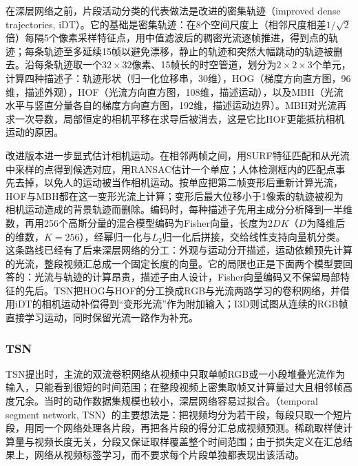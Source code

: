 在深层网络之前，片段活动分类的代表做法是改进的密集轨迹（improved dense trajectories, iDT）。它的基础是密集轨迹：在8个空间尺度上（相邻尺度相差$1/\sqrt{2}$倍）每隔5个像素采样特征点，用中值滤波后的稠密光流逐帧推进，得到点的轨迹；每条轨迹至多延续15帧以避免漂移，静止的轨迹和突然大幅跳动的轨迹被删去。沿每条轨迹取一个$32\times32$像素、15帧长的时空管道，划分为$2\times2\times3$个单元，计算四种描述子：轨迹形状（归一化位移串，30维），HOG（梯度方向直方图，96维，描述外观），HOF（光流方向直方图，108维，描述运动），以及MBH（光流水平与竖直分量各自的梯度方向直方图，192维，描述运动边界）。MBH对光流再求一次导数，局部恒定的相机平移在求导后被消去，这是它比HOF更能抵抗相机运动的原因。

改进版本进一步显式估计相机运动。在相邻两帧之间，用SURF特征匹配和从光流中采样的点得到候选对应，用RANSAC估计一个单应；人体检测框内的匹配点事先去掉，以免人的运动被当作相机运动。按单应把第二帧变形后重新计算光流，HOF与MBH都在这一变形光流上计算；变形后最大位移小于1像素的轨迹被视为相机运动造成的背景轨迹而删除。编码时，每种描述子先用主成分分析降到一半维数，再用256个高斯分量的混合模型编码为Fisher向量，长度为$2DK$（$D$为降维后的维数，$K=256$），经幂归一化与$L_2$归一化后拼接，交给线性支持向量机分类。这条路线已经有了后来深层网络的分工：外观与运动分开描述，运动依赖预先计算的光流，整段视频汇总成一个固定长度的向量。它的局限也正是下面两个模型要回答的：光流与轨迹的计算昂贵，描述子由人设计，Fisher向量编码又不保留局部特征的先后。TSN把HOG与HOF的分工换成RGB与光流两路学习的卷积网络，并借用iDT的相机运动补偿得到“变形光流”作为附加输入；I3D则试图从连续的RGB帧直接学习运动，同时保留光流一路作为补充。

\subsubsection{TSN}
\label{sec:vision-video-tsn}

TSN提出时，主流的双流卷积网络从视频中只取单帧RGB或一小段堆叠光流作为输入，只能看到很短的时间范围；在整段视频上密集取帧又计算量过大且相邻帧高度冗余。当时的动作数据集规模也较小，深层网络容易过拟合。（temporal segment network, TSN）的主要想法是：把视频均分为若干段，每段只取一个短片段，用同一个网络处理各片段，再把各片段的得分汇总成视频预测。稀疏取样使计算量与视频长度无关，分段又保证取样覆盖整个时间范围；由于损失定义在汇总结果上，网络从视频标签学习，而不要求每个片段单独都表现出该活动。

